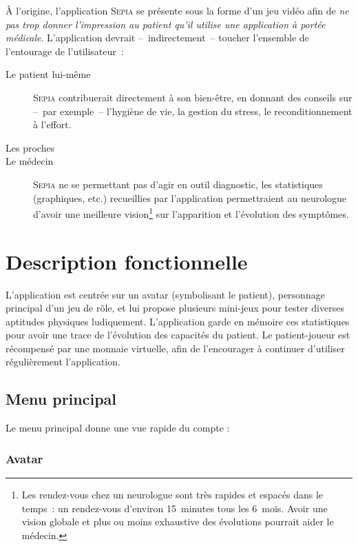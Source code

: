 \documentclass[a4paper,12pt,francais]{article}
\newcommand{\Sepia}{\textsc{Sepia}\xspace}
\begin{document}
À l’origine, l’application \Sepia{} se présente sous la forme d’un jeu vidéo afin de \emph{ne pas trop donner l’impression au patient qu’il utilise une application à portée médicale}. L’application devrait –~indirectement~– toucher l’ensemble de l’entourage de l’utilisateur~:
\begin{description}
    \item[Le patient lui-même] \Sepia{} contribuerait directement à son bien-être, en donnant des conseils sur –~par exemple~– l’hygiène de vie, la gestion du stress, le reconditionnement à l’effort.
    \item[Les proches] %
    \item[Le médecin] \Sepia{} ne se permettant pas d’agir en outil diagnostic, les statistiques (graphiques, etc.) recueillies par l’application permettraient au neurologue d’avoir une meilleure vision\footnote{Les rendez-vous chez un neurologue sont très rapides et espacés dans le temps~: un rendez-vous d’environ 15~minutes tous les 6~mois. Avoir une vision globale et plus ou moins exhaustive des évolutions pourrait aider le médecin.} sur l’apparition et l’évolution des symptômes.
\end{description}

\section{Description fonctionnelle}

L'application est centrée sur un avatar (symbolisant le patient), personnage principal d'un jeu de rôle, et lui propose plusieurs mini-jeux pour tester diverses aptitudes physiques ludiquement. L'application garde en mémoire ces statistiques pour avoir une trace de l'évolution des capacités du patient. Le patient-joueur est récompensé par une monnaie virtuelle, afin de l'encourager à continuer d'utiliser régulièrement l'application.

\subsection{Menu principal}

Le menu principal donne une vue rapide du compte :

\subsubsection{Avatar}
\end{document}
